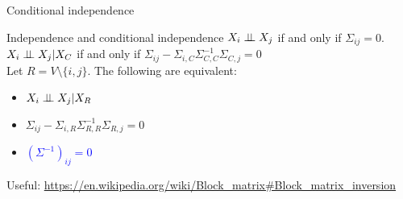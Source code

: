 \documentclass[11pt,handout,aspectratio=169,dvipsnames]{beamer}
\begin{document}
\begin{frame}{Conditional independence}
\begin{alertblock}{Independence and conditional independence}
$X_i\perp\!\!\! \perp X_j$ if and only if $\Sigma_{ij}=0$.\\[.3cm]
$X_i\perp\!\!\! \perp X_j|X_{C}$\;\; if and only if \;\; $\Sigma_{ij}-\Sigma_{i,C}\Sigma_{C,C}^{-1}\Sigma_{C,j}=0$\\[.3cm]
Let $R=V\setminus \{i,j\}$. The following are equivalent:
\begin{itemize}
	\item $X_i\perp\!\!\! \perp X_j|X_{R}$
	\item $\Sigma_{ij}-\Sigma_{i,R}\Sigma_{R,R}^{-1}\Sigma_{R,j}=0$
	\item \textcolor{blue}{$(\Sigma^{-1})_{ij}=0$}
\end{itemize}
\end{alertblock}
{\tiny Useful: \url{https://en.wikipedia.org/wiki/Block_matrix\#Block_matrix_inversion}}
\end{frame}
\end{document}
